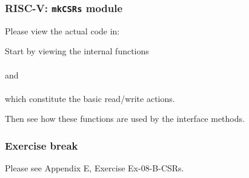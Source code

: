 \begin{frame}
\frametitle{RISC-V: {\tt mkCSRs} module}

\footnotesize

\begin{center}\large
 Please view the actual code in: 
\end{center}

\vspace{2ex}

Start by viewing the internal functions \\
 \\
and \\
 \\
which constitute the basic read/write actions.

\vspace{2ex}

Then see how these functions are used by the interface methods.

\end{frame}


\begin{frame}
\frametitle{\EmojiExercise \hmm Exercise break}

Please see Appendix E, Exercise Ex-08-B-CSRs.

\end{frame}






